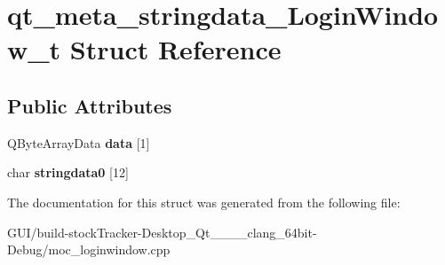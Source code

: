 \hypertarget{structqt__meta__stringdata___login_window__t}{}\section{qt\+\_\+meta\+\_\+stringdata\+\_\+\+Login\+Window\+\_\+t Struct Reference}
\label{structqt__meta__stringdata___login_window__t}
\subsection*{Public Attributes}
\begin{DoxyCompactItemize}
\item 
\mbox{\label{structqt__meta__stringdata___login_window__t_a1bba190f85409f727d4ce9f07887182a}} 
Q\+Byte\+Array\+Data {\bfseries data} \mbox{[}1\mbox{]}
\item 
\mbox{\label{structqt__meta__stringdata___login_window__t_a8cf7dcb41ff37f4cd906c590237bfbb8}} 
char {\bfseries stringdata0} \mbox{[}12\mbox{]}
\end{DoxyCompactItemize}


The documentation for this struct was generated from the following file\+:\begin{DoxyCompactItemize}
\item 
G\+U\+I/build-\/stock\+Tracker-\/\+Desktop\+\_\+\+Qt\+\_\+\_\+\_\+\_\+clang\+\_\+64bit-\/\+Debug/moc\+\_\+loginwindow.\+cpp\end{DoxyCompactItemize}
